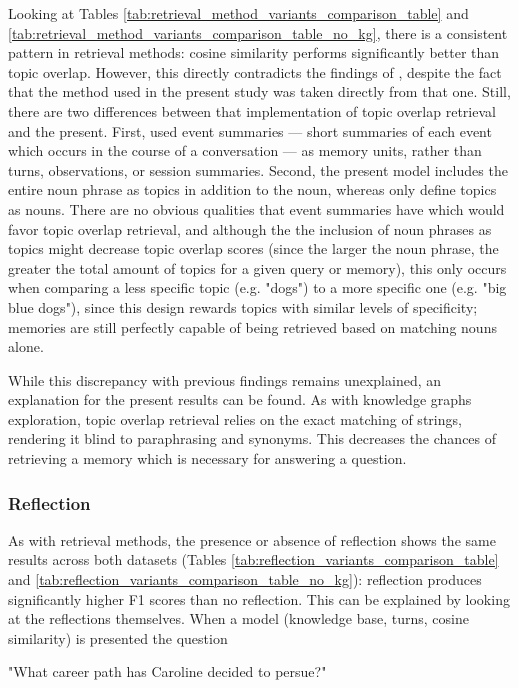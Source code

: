 Looking at Tables \ref{tab:retrieval_method_variants_comparison_table} and \ref{tab:retrieval_method_variants_comparison_table_no_kg}, there is a consistent pattern in retrieval methods: cosine similarity performs significantly better than topic overlap. However, this directly contradicts the findings of \cite{Li2024}, despite the fact that the method used in the present study was taken directly from that one. Still, there are two differences between that implementation of topic overlap retrieval and the present. First, \cite{Li2024} used event summaries — short summaries of each event which occurs in the course of a conversation — as memory units, rather than turns, observations, or session summaries. Second, the present model includes the entire noun phrase as topics in addition to the noun, whereas \cite{Li2024} only define topics as nouns. There are no obvious qualities that event summaries have which would favor topic overlap retrieval, and although the the inclusion of noun phrases as topics might decrease topic overlap scores (since the larger the noun phrase, the greater the total amount of topics for a given query or memory), this only occurs when comparing a less specific topic (e.g. "dogs") to a more specific one (e.g. "big blue dogs"), since this design rewards topics with similar levels of specificity; memories are still perfectly capable of being retrieved based on matching nouns alone.
 
While this discrepancy with previous findings remains unexplained, an explanation for the present results can be found. As with knowledge graphs exploration, topic overlap retrieval relies on the exact matching of strings, rendering it blind to paraphrasing and synonyms. This decreases the chances of retrieving a memory which is necessary for answering a question.


\subsubsection{Reflection}

As with retrieval methods, the presence or absence of reflection shows the same results across both datasets (Tables \ref{tab:reflection_variants_comparison_table} and \ref{tab:reflection_variants_comparison_table_no_kg}): reflection produces significantly higher F1 scores than no reflection. This can be explained by looking at the reflections themselves. When a model (knowledge base, turns, cosine similarity) is presented the question

\begin{displayquote}
"What career path has Caroline decided to persue?"
\end{displayquote}

